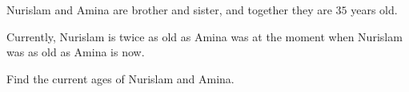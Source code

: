 Nurislam and Amina are brother and sister, and together they are $35$ years old.



Currently, Nurislam is twice as old as Amina was at the moment when Nurislam was as old as Amina is now.



Find the current ages of Nurislam and Amina.
